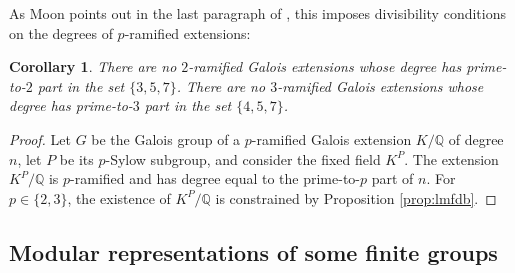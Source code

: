 \documentclass{amsart}
\newtheorem{corollary}[theorem]{Corollary}
\theoremstyle{definition}
\newcommand{\Q}{\mathbb{Q}}
\begin{document}
As Moon points out in the last paragraph of \cite{Mo2}, this imposes divisibility conditions on the degrees of $p$-ramified extensions:
\begin{corollary}\label{cor:lmfdb}
  There are no $2$-ramified Galois extensions whose degree has prime-to-$2$ part in the set $\{3,5,7\}$.
  There are no $3$-ramified Galois extensions whose degree has prime-to-$3$ part in the set $\{4,5,7\}$.
\end{corollary}
\begin{proof}
  Let $G$ be the Galois group of a $p$-ramified Galois extension $K/\Q$ of degree $n$, let $P$ be its $p$-Sylow subgroup, and consider the fixed field $K^P$.
  The extension $K^P/\Q$ is $p$-ramified and has degree equal to the prime-to-$p$ part of $n$.
  For $p\in\{2,3\}$, the existence of $K^P/\Q$ is constrained by Proposition \ref{prop:lmfdb}.
\end{proof}

\subsection{Modular representations of some finite groups}
\end{document}
